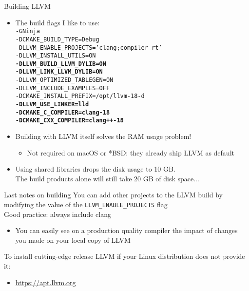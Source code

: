 \begin{frame}{Building LLVM}
\begin{itemize}
\item The build flags I like to use:\\
\smallskip\texttt{\small-GNinja \\
-DCMAKE\_BUILD\_TYPE=Debug\\
-DLLVM\_ENABLE\_PROJECTS='clang;compiler-rt' \\
-DLLVM\_INSTALL\_UTILS=ON \\
\textbf{-DLLVM\_BUILD\_LLVM\_DYLIB=ON \\
-DLLVM\_LINK\_LLVM\_DYLIB=ON} \\
-DLLVM\_OPTIMIZED\_TABLEGEN=ON \\
-DLLVM\_INCLUDE\_EXAMPLES=OFF \\
-DCMAKE\_INSTALL\_PREFIX=/opt/llvm-18-d \\
\textbf{-DLLVM\_USE\_LINKER=lld \\
-DCMAKE\_C\_COMPILER=clang-18 \\
-DCMAKE\_CXX\_COMPILER=clang++-18} \\
}
\item Building with LLVM itself solves the RAM usage problem!
	\begin{itemize}
	\item Not required on macOS or *BSD: they already ship LLVM as default
	\end{itemize}
\item Using \alert{shared libraries} drops the disk usage to \alert{10 GB}.\\
{\footnotesize The build products alone will still take 20 GB of disk space...}
\end{itemize}
\end{frame}


\begin{frame}{Last notes on building}
You can add other projects to the LLVM build by modifying the value of the \texttt{LLVM\_ENABLE\_PROJECTS} flag\\
\bigskip
Good practice: \alert{always include clang}
\begin{itemize}
	\item You can easily see on a production quality compiler the impact of changes you made on your local copy of LLVM
\end{itemize}
\bigskip
To install cutting-edge release LLVM if your Linux distribution does not provide it:\\
\begin{itemize}
	\item \url{https://apt.llvm.org}
\end{itemize}
\end{frame}


